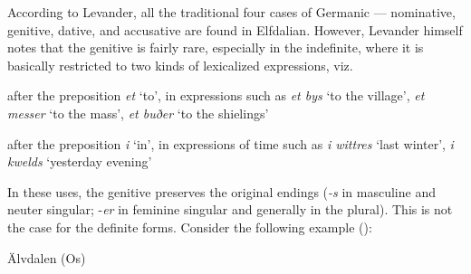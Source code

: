 According to Levander, all the traditional four cases of Germanic — nominative, genitive, dative, and accusative are found in Elfdalian. However, Levander himself notes that the genitive is fairly rare, especially in the indefinite, where it is basically restricted to two kinds of lexicalized expressions, viz. 


\item 

after the preposition \textit{et} ‘to’, in expressions such as \textit{et bys} ‘to the village’, \textit{et messer} ‘to the mass’, \textit{et buðer} ‘to the shielings’


\item 

after the preposition \textit{i} ‘in’, in expressions of time such as \textit{i wittres} ‘last winter’, \textit{i kwelds }‘yesterday evening’



In these uses, the genitive preserves the original endings (\textit{\nobreakdash-s }in masculine and neuter singular; \nobreakdash-\textit{er} in feminine singular and generally in the plural). This is not the case for the definite forms. Consider the following example (\citet[96]{Levander1909}):


\item 

Älvdalen (Os)




